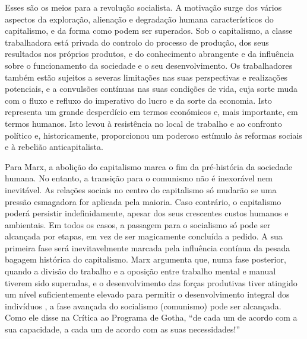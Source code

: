 Esses são os meios para a revolução socialista. A motivação surge dos vários aspectos da exploração, alienação e degradação humana característicos do capitalismo, e da forma como podem ser superados. Sob o capitalismo, a classe trabalhadora está privada do controlo do processo de produção, dos seus resultados nos próprios produtos, e do conhecimento abrangente e da influência sobre o funcionamento da sociedade e o seu desenvolvimento. Os trabalhadores também estão sujeitos a severas limitações nas suas perspectivas e realizações potenciais, e a convulsões contínuas nas suas condições de vida, cuja sorte muda com o fluxo e refluxo do imperativo do lucro e da sorte da economia. Isto representa um grande desperdício em termos económicos e, mais importante, em termos humanos. Isto levou à resistência no local de trabalho e ao confronto político e, historicamente, proporcionou um poderoso estímulo às reformas sociais e à rebelião anticapitalista.
 \par 
Para Marx, a abolição do capitalismo marca o fim da pré-história da sociedade humana. No entanto, a transição para o comunismo não é inexorável nem inevitável. As relações sociais no centro do capitalismo só mudarão se uma pressão esmagadora for aplicada pela maioria. Caso contrário, o capitalismo poderá persistir indefinidamente, apesar dos seus crescentes custos humanos e ambientais. Em todos os casos, a passagem para o socialismo só pode ser alcançada por etapas, em vez de ser magicamente concluída a pedido. A sua primeira fase será inevitavelmente marcada pela influência contínua da pesada bagagem histórica do capitalismo. Marx argumenta que, numa fase posterior, quando a divisão do trabalho e a oposição entre trabalho mental e manual tiverem sido superadas, e o desenvolvimento das forças produtivas tiver atingido um nível suficientemente elevado para permitir o desenvolvimento integral dos indivíduos , a fase avançada do socialismo (comunismo) pode ser alcançada. Como ele disse na Crítica ao Programa de Gotha, “de cada um de acordo com a sua capacidade, a cada um de acordo com as suas necessidades!”
 \par 
